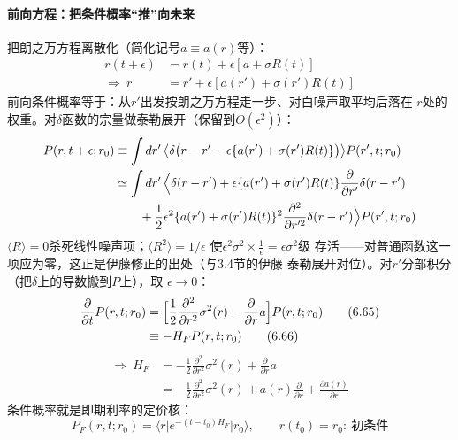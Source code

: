 \paragraph{前向方程：把条件概率“推”向未来}
把朗之万方程离散化（简化记号$a\equiv a(r)$等）：
\begin{align*}
r(t+\epsilon)&=r(t)+\epsilon[a+\sigma R(t)]\\
\Rightarrow\ r&=r'+\epsilon[a(r')+\sigma(r')R(t)]
\tag{6.64}
\end{align*}
前向条件概率等于：从$r'$出发按朗之万方程走一步、对白噪声取平均后落在
$r$处的权重。对$\delta$函数的宗量做泰勒展开（保留到$O(\epsilon^2)$）：
\begin{align*}
P(r,t+\epsilon;r_0)&\equiv\int dr'\,\bigl\langle
\delta\bigl(r-r'-\epsilon\{a(r')+\sigma(r')R(t)\}\bigr)\bigr\rangle
P(r',t;r_0)\\
&\simeq\int dr'\,\Bigl\langle\delta(r-r')
+\epsilon\{a(r')+\sigma(r')R(t)\}\frac{\partial}{\partial r'}
\delta(r-r')\\
&\qquad+\frac{1}{2}\epsilon^2\{a(r')+\sigma(r')R(t)\}^2
\frac{\partial^2}{\partial r'^2}\delta(r-r')\Bigr\rangle
P(r',t;r_0)
\end{align*}
$\langle R\rangle=0$杀死线性噪声项；$\langle R^2\rangle=1/\epsilon$
使$\epsilon^2\sigma^2\times\frac{1}{\epsilon}=\epsilon\sigma^2$级
存活——对普通函数这一项应为零，这正是伊藤修正的出处（与3.4节的伊藤
泰勒展开对位）。对$r'$分部积分（把$\delta$上的导数搬到$P$上），取
$\epsilon\to0$：
\begin{align*}
\frac{\partial}{\partial t}P(r,t;r_0)
&=\Bigl[\frac{1}{2}\frac{\partial^2}{\partial r^2}\sigma^2(r)
-\frac{\partial}{\partial r}a\Bigr]P(r,t;r_0)
\tag{6.65}\\
&\equiv-H_FP(r,t;r_0)
\tag{6.66}
\end{align*}
\begin{align*}
\Rightarrow\ H_F&=-\frac{1}{2}\frac{\partial^2}{\partial r^2}
\sigma^2(r)+\frac{\partial}{\partial r}a\\
&=-\frac{1}{2}\frac{\partial^2}{\partial r^2}\sigma^2(r)
+a(r)\frac{\partial}{\partial r}+\frac{\partial a(r)}{\partial r}
\tag{6.67}
\end{align*}
条件概率就是即期利率的定价核：
\begin{equation*}
P_F(r,t;r_0)=\langle r\vert e^{-(t-t_0)H_F}\vert r_0\rangle,\qquad
r(t_0)=r_0:\ \text{初条件}
\tag{6.68}
\end{equation*}

